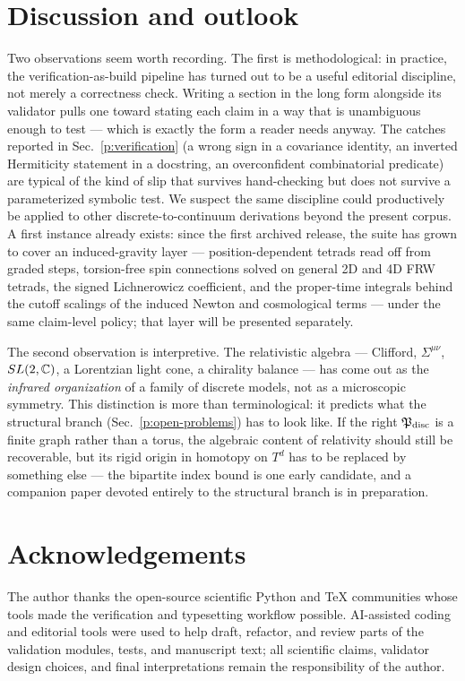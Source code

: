 \section{Discussion and outlook}
\label{p:conclusions}

Two observations seem worth recording. The first is methodological: in
practice, the verification-as-build pipeline has turned out to be a
useful editorial discipline, not merely a correctness check. Writing a
section in the long form alongside its validator pulls one toward
stating each claim in a way that is unambiguous enough to test --- which
is exactly the form a reader needs anyway. The catches reported in
Sec.~\ref{p:verification} (a wrong sign in a covariance identity, an
inverted Hermiticity statement in a docstring, an overconfident
combinatorial predicate) are typical of the kind of slip that survives
hand-checking but does not survive a parameterized symbolic test. We
suspect the same discipline could productively be applied to other
discrete-to-continuum derivations beyond the present corpus. A first
instance already exists: since the first archived release, the suite
has grown to cover an induced-gravity layer --- position-dependent
tetrads read off from graded steps, torsion-free spin connections
solved on general 2D and 4D FRW tetrads, the signed Lichnerowicz
coefficient, and the proper-time integrals behind the cutoff scalings
of the induced Newton and cosmological terms --- under the same
claim-level policy; that layer will be presented separately.

The second observation is interpretive. The relativistic algebra ---
Clifford, $\Sigma^{\mu\nu}$, $SL(2,\mathbb{C})$, a Lorentzian light cone, a
chirality balance --- has come out as the \emph{infrared organization}
of a family of discrete models, not as a microscopic symmetry. This
distinction is more than terminological: it predicts what the structural
branch (Sec.~\ref{p:open-problems}) has to look like. If the right
$\mathfrak{P}_{\mathrm{disc}}$ is a finite graph rather than a torus, the algebraic content of
relativity should still be recoverable, but its rigid origin in
homotopy on $T^{d}$ has to be replaced by something else --- the
bipartite index bound is one early candidate, and a companion paper
devoted entirely to the structural branch is in preparation.

\section*{Acknowledgements}
The author thanks the open-source scientific Python and TeX communities
whose tools made the verification and typesetting workflow possible.
AI-assisted coding and editorial tools were used to help draft, refactor,
and review parts of the validation modules, tests, and manuscript text;
all scientific claims, validator design choices, and final interpretations
remain the responsibility of the author.

